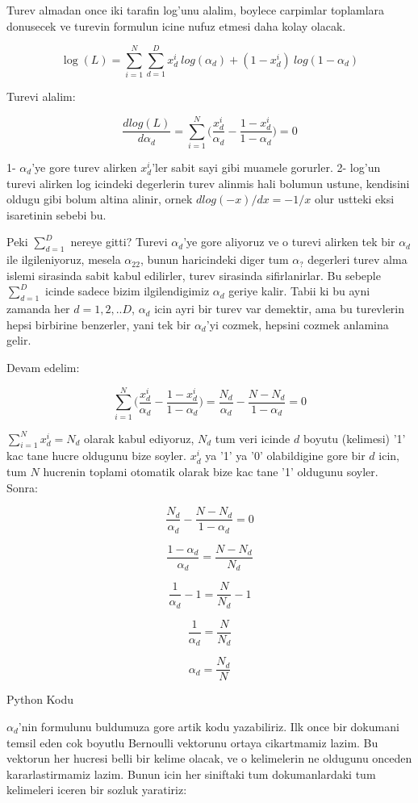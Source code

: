 \documentclass[12pt,fleqn]{article}\usepackage{../common}
\begin{document}
Turev almadan once iki tarafin log'unu alalim, boylece carpimlar toplamlara
donusecek ve turevin formulun icine nufuz etmesi daha kolay olacak.

$$ \log(L) = \sum_{i=1}^N \sum_{d=1}^{D} {x_d^i}\ log (\alpha_d) + 
(1-x_d^i)\ log (1-\alpha_d) $$

Turevi alalim:

$$ \frac{dlog(L)}{d\alpha_d} = \sum_{i=1}^N \bigg( \frac{x_d^i}{\alpha_d} -
\frac{1-x_d^i}{1-\alpha_d} \bigg) = 0
 $$

1- $\alpha_d$'ye gore turev alirken $x_d^i$'ler sabit sayi gibi muamele
gorurler. 2- log'un turevi alirken log icindeki degerlerin turev alinmis hali
bolumun ustune, kendisini oldugu gibi bolum altina alinir, ornek 
$dlog(-x)/dx = -1/x$ olur ustteki eksi isaretinin sebebi bu. 

Peki $\sum_{d=1}^{D}$ nereye gitti? Turevi $\alpha_d$'ye gore aliyoruz ve o
turevi alirken tek bir $\alpha_d$ ile ilgileniyoruz, mesela $\alpha_{22}$,
bunun haricindeki diger tum $\alpha_?$ degerleri turev alma islemi
sirasinda sabit kabul edilirler, turev sirasinda sifirlanirlar. Bu sebeple
$\sum_{d=1}^{D}$ icinde sadece bizim ilgilendigimiz $\alpha_d$ geriye
kalir. Tabii ki bu ayni zamanda her $d=1,2,..D$, $\alpha_d$ icin ayri bir
turev var demektir, ama bu turevlerin hepsi birbirine benzerler, yani tek
bir $\alpha_d$'yi cozmek, hepsini cozmek anlamina gelir.

Devam edelim:

$$ \sum_{i=1}^N \bigg( \frac{x_d^i}{\alpha_d} - \frac{1-x_d^i}{1-\alpha_d} \bigg) =
\frac{N_d}{\alpha_d} - \frac{N-N_d}{1-\alpha_d} = 0
 $$

$\sum_{i=1}^N x_d^i = N_d$ olarak kabul ediyoruz, $N_d$ tum veri icinde $d$
boyutu (kelimesi) '1' kac tane hucre oldugunu bize soyler. $x_d^i$ ya '1' ya '0'
olabildigine gore bir $d$ icin, tum $N$ hucrenin toplami otomatik olarak bize
kac tane '1' oldugunu soyler. Sonra:

$$ \frac{N_d}{\alpha_d} - \frac{N-N_d}{1-\alpha_d} = 0  $$

$$ \frac{1-\alpha_d}{\alpha_d} = \frac{N-N_d}{N_d}   $$

$$ \frac{1}{\alpha_d} - 1 = \frac{N}{N_d} - 1  $$

$$ \frac{1}{\alpha_d} = \frac{N}{N_d}  $$

$$ \alpha_d = \frac{N_d}{N}  $$

Python Kodu

$\alpha_d$'nin formulunu buldumuza gore artik kodu yazabiliriz. Ilk once bir
dokumani temsil eden cok boyutlu Bernoulli vektorunu ortaya cikartmamiz
lazim. Bu vektorun her hucresi belli bir kelime olacak, ve o kelimelerin ne
oldugunu onceden kararlastirmamiz lazim. Bunun icin her siniftaki tum
dokumanlardaki tum kelimeleri iceren bir sozluk yaratiriz:
\end{document}
